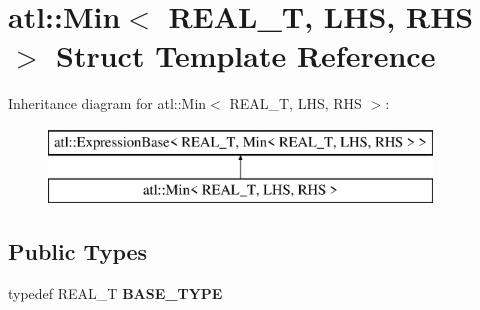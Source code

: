 \hypertarget{structatl_1_1_min}{\section{atl\+:\+:Min$<$ R\+E\+A\+L\+\_\+\+T, L\+H\+S, R\+H\+S $>$ Struct Template Reference}
\label{structatl_1_1_min}
}
Inheritance diagram for atl\+:\+:Min$<$ R\+E\+A\+L\+\_\+\+T, L\+H\+S, R\+H\+S $>$\+:\begin{figure}[H]
\begin{center}
\leavevmode
\includegraphics[height=2.000000cm]{structatl_1_1_min}
\end{center}
\end{figure}
\subsection*{Public Types}
\begin{DoxyCompactItemize}
\item 
\hypertarget{structatl_1_1_min_a37f513e8533cfbdb9b71214bc0368642}{typedef R\+E\+A\+L\+\_\+\+T {\bfseries B\+A\+S\+E\+\_\+\+T\+Y\+P\+E}}\label{structatl_1_1_min_a37f513e8533cfbdb9b71214bc0368642}

\end{DoxyCompactItemize}
